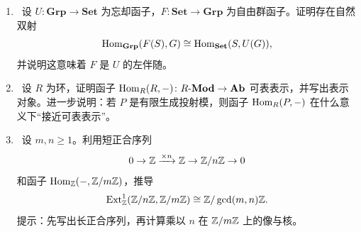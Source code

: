 \begin{enumerate}[resume, label=\textbf{习题A.\arabic*}, leftmargin=3.5em]
  \item \hard\ 设 $U\colon \mathbf{Grp}\to \mathbf{Set}$ 为忘却函子，$F\colon \mathbf{Set}\to \mathbf{Grp}$ 为自由群函子。证明存在自然双射
  \[
    \mathrm{Hom}_{\mathbf{Grp}}(F(S),G)\cong \mathrm{Hom}_{\mathbf{Set}}(S,U(G)),
  \]
  并说明这意味着 $F$ 是 $U$ 的左伴随。

  \item \hard\ 设 $R$ 为环，证明函子 $\mathrm{Hom}_R(R,-)\colon R\text{-}\mathbf{Mod}\to \mathbf{Ab}$ 可表表示，并写出表示对象。进一步说明：若 $P$ 是有限生成投射模，则函子 $\mathrm{Hom}_R(P,-)$ 在什么意义下“接近可表表示”。

  \item \hard\ 设 $m,n\ge 1$。利用短正合序列
  \[
    0\to \mathbb{Z} \xrightarrow{\times n} \mathbb{Z} \to \mathbb{Z}/n\mathbb{Z} \to 0
  \]
  和函子 $\mathrm{Hom}_{\mathbb{Z}}(-,\mathbb{Z}/m\mathbb{Z})$，推导
  \[
    \mathrm{Ext}^1_{\mathbb{Z}}(\mathbb{Z}/n\mathbb{Z},\mathbb{Z}/m\mathbb{Z})\cong \mathbb{Z}/\gcd(m,n)\mathbb{Z}.
  \]
  提示：先写出长正合序列，再计算乘以 $n$ 在 $\mathbb{Z}/m\mathbb{Z}$ 上的像与核。
\end{enumerate}
